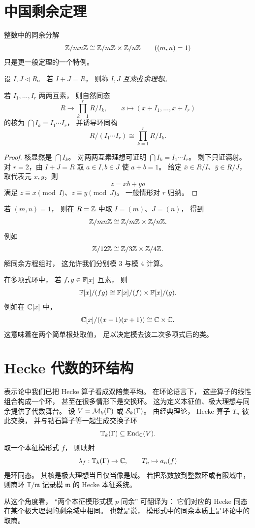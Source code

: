 \section{中国剩余定理}
整数中的同余分解
\[
\mathbb{Z}/mn\mathbb{Z}\cong \mathbb{Z}/m\mathbb{Z}\times \mathbb{Z}/n\mathbb{Z}
\qquad ((m,n)=1)
\]
只是更一般定理的一个特例。
\begin{definition}
设 $I,J\triangleleft R$。 若 $I+J=R$， 则称 $I,J$ \emph{互素}或\emph{余理想}。
\end{definition}
\begin{theorem}[中国剩余定理]
若 $I_1,\dots,I_r$ 两两互素， 则自然同态
\[
R\to \prod_{k=1}^r R/I_k,
\qquad
x\mapsto (x+I_1,\dots,x+I_r)
\]
的核为 $\bigcap I_k=I_1\cdots I_r$， 并诱导环同构
\[
R/(I_1\cdots I_r)\cong \prod_{k=1}^r R/I_k.
\]
\end{theorem}
\begin{proof}
核显然是 $\bigcap I_k$。 对两两互素理想可证明 $\bigcap I_k=I_1\cdots I_r$。 剩下只证满射。 对 $r=2$，由 $I+J=R$ 取 $a\in I,b\in J$ 使 $a+b=1$。 给定 $\bar x\in R/I$、$\bar y\in R/J$， 取代表元 $x,y$，则
\[
z=xb+ya
\]
满足 $z\equiv x\pmod I$、$z\equiv y\pmod J$。 一般情形对 $r$ 归纳。
\end{proof}
\begin{example}
若 $(m,n)=1$， 则在 $R=\mathbb{Z}$ 中取 $I=(m)$、$J=(n)$， 得到
\[
\mathbb{Z}/mn\mathbb{Z}\cong \mathbb{Z}/m\mathbb{Z}\times \mathbb{Z}/n\mathbb{Z}.
\]
例如
\[
\mathbb{Z}/12\mathbb{Z}\cong \mathbb{Z}/3\mathbb{Z}\times \mathbb{Z}/4\mathbb{Z}.
\]
解同余方程组时， 这允许我们分别模 $3$ 与模 $4$ 计算。
\end{example}
\begin{example}
在多项式环中， 若 $f,g\in \mathbb{F}[x]$ 互素， 则
\[
\mathbb{F}[x]/(fg)\cong \mathbb{F}[x]/(f)\times \mathbb{F}[x]/(g).
\]
例如在 $\mathbb{C}[x]$ 中，
\[
\mathbb{C}[x]/((x-1)(x+1))\cong \mathbb{C}\times \mathbb{C}.
\]
这意味着在两个简单根处取值， 足以决定模去该二次多项式后的类。
\end{example}
\section{Hecke 代数的环结构}
表示论中我们已把 Hecke 算子看成双陪集平均。 在环论语言下， 这些算子的线性组合构成一个环， 甚至在很多情形下是交换环。 这为定义本征值、极大理想与同余提供了代数舞台。 设 $V=\mathcal{M}_k(\Gamma)$ 或 $\mathcal{S}_k(\Gamma)$。 由经典理论， Hecke 算子 $T_n$ 彼此交换， 并与钻石算子等一起生成交换子环
\[
\mathbb{T}_{k}(\Gamma)\subseteq \mathrm{End}_{\mathbb{C}}(V).
\]
取一个本征模形式 $f$， 则映射
\[
\lambda_f:\mathbb{T}_{k}(\Gamma)\to \mathbb{C},
\qquad T_n\mapsto a_n(f)
\]
是环同态。 其核是极大理想当且仅当像是域。 若把系数放到整数环或有限域中， 则商环 $\mathbb{T}/\mathfrak m$ 记录模 $\mathfrak m$ 的 Hecke 本征系统。
\begin{remark}
从这个角度看， “两个本征模形式模 $p$ 同余” 可翻译为： 它们对应的 Hecke 同态在某个极大理想的剩余域中相同。 也就是说， 模形式中的同余本质上是环论中的取商。
\end{remark}
